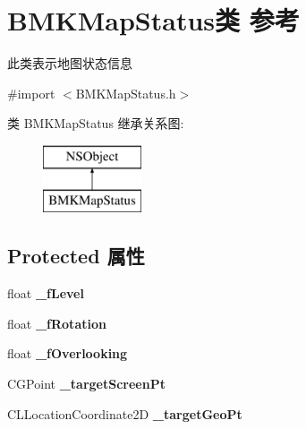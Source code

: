 \hypertarget{interface_b_m_k_map_status}{}\section{B\+M\+K\+Map\+Status类 参考}
\label{interface_b_m_k_map_status}


此类表示地图状态信息  




{\ttfamily \#import $<$B\+M\+K\+Map\+Status.\+h$>$}

类 B\+M\+K\+Map\+Status 继承关系图\+:\begin{figure}[H]
\begin{center}
\leavevmode
\includegraphics[height=2.000000cm]{interface_b_m_k_map_status}
\end{center}
\end{figure}
\subsection*{Protected 属性}
\begin{DoxyCompactItemize}
\item 
\hypertarget{interface_b_m_k_map_status_a0c67450ec78dc6be5e87fed6aa3ade92}{}float {\bfseries \+\_\+f\+Level}\label{interface_b_m_k_map_status_a0c67450ec78dc6be5e87fed6aa3ade92}

\item 
\hypertarget{interface_b_m_k_map_status_a04fb6a2f91634c82423dcd9bf07efa12}{}float {\bfseries \+\_\+f\+Rotation}\label{interface_b_m_k_map_status_a04fb6a2f91634c82423dcd9bf07efa12}

\item 
\hypertarget{interface_b_m_k_map_status_a3a4fb7039f93b796646d161e4e87ae77}{}float {\bfseries \+\_\+f\+Overlooking}\label{interface_b_m_k_map_status_a3a4fb7039f93b796646d161e4e87ae77}

\item 
\hypertarget{interface_b_m_k_map_status_aa440aec20efe8874977fa9fc18d71604}{}C\+G\+Point {\bfseries \+\_\+target\+Screen\+Pt}\label{interface_b_m_k_map_status_aa440aec20efe8874977fa9fc18d71604}

\item 
\hypertarget{interface_b_m_k_map_status_adca8672a6bea448a9eadcaf65df7eae2}{}C\+L\+Location\+Coordinate2\+D {\bfseries \+\_\+target\+Geo\+Pt}\label{interface_b_m_k_map_status_adca8672a6bea448a9eadcaf65df7eae2}

\end{DoxyCompactItemize}
